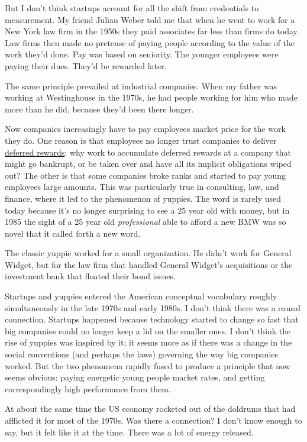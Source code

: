 But I don't think startups account for all the shift from credentials to
measurement. My friend Julian Weber told me that when he went to work
for a New York law firm in the 1950s they paid associates far less than
firms do today. Law firms then made no pretense of paying people
according to the value of the work they'd done. Pay was based on
seniority. The younger employees were paying their dues. They'd be
rewarded later.

The same principle prevailed at industrial companies. When my father was
working at Westinghouse in the 1970s, he had people working for him who
made more than he did, because they'd been there longer.

Now companies increasingly have to pay employees market price for the
work they do. One reason is that employees no longer trust companies to
deliver \href{ladder.html}{deferred rewards}: why work to accumulate
deferred rewards at a company that might go bankrupt, or be taken over
and have all its implicit obligations wiped out? The other is that some
companies broke ranks and started to pay young employees large amounts.
This was particularly true in consulting, law, and finance, where it led
to the phenomenon of yuppies. The word is rarely used today because it's
no longer surprising to see a 25 year old with money, but in 1985 the
sight of a 25 year old \emph{professional} able to afford a new BMW was
so novel that it called forth a new word.

The classic yuppie worked for a small organization. He didn't work for
General Widget, but for the law firm that handled General Widget's
acquisitions or the investment bank that floated their bond issues.

Startups and yuppies entered the American conceptual vocabulary roughly
simultaneously in the late 1970s and early 1980s. I don't think there
was a causal connection. Startups happened because technology started to
change so fast that big companies could no longer keep a lid on the
smaller ones. I don't think the rise of yuppies was inspired by it; it
seems more as if there was a change in the social conventions (and
perhaps the laws) governing the way big companies worked. But the two
phenomena rapidly fused to produce a principle that now seems obvious:
paying energetic young people market rates, and getting correspondingly
high performance from them.

At about the same time the US economy rocketed out of the doldrums that
had afflicted it for most of the 1970s. Was there a connection? I don't
know enough to say, but it felt like it at the time. There was a lot of
energy released.

